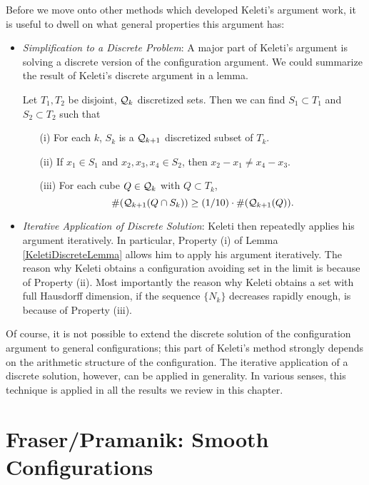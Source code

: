 Before we move onto other methods which developed Keleti's argument work, it is useful to dwell on what general properties this argument has:
%
\begin{itemize}
    \item \emph{Simplification to a Discrete Problem}: A major part of Keleti's argument is solving a discrete version of the configuration argument. We could summarize the result of Keleti's discrete argument in a lemma.
    \begin{lemma} \label{KeletiDiscreteLemma}
        Let $T_1, T_2$ be disjoint, $\operatorname{\mathcal{Q}}_k$ discretized sets. Then we can find $S_1 \subset T_1$ and $S_2 \subset T_2$ such that
        \begin{enumerate}
            \item[(i)] For each $k$, $S_k$ is a $\operatorname{\mathcal{Q}}_{k+1}$ discretized subset of $T_k$.
            \item[(ii)] If $x_1 \in S_1$ and $x_2,x_3,x_4 \in S_2$, then $x_2 - x_1 \neq x_4 - x_3$.
            \item[(iii)] For each cube $Q \in \operatorname{\mathcal{Q}}_k$ with $Q \subset T_k$,
            \[ \#(\operatorname{\mathcal{Q}}_{k+1}(Q \cap S_k)) \geq (1/10) \cdot \#(\operatorname{\mathcal{Q}}_{k+1}(Q)). \]
        \end{enumerate}
    \end{lemma}

    \item \emph{Iterative Application of Discrete Solution}: Keleti then repeatedly applies his argument iteratively. In particular, Property (i) of Lemma \ref{KeletiDiscreteLemma} allows him to apply his argument iteratively. The reason why Keleti obtains a configuration avoiding set in the limit is because of Property (ii). Most importantly the reason why Keleti obtains a set with full Hausdorff dimension, if the sequence $\{ N_k \}$ decreases rapidly enough, is because of Property (iii).
\end{itemize}

Of course, it is not possible to extend the discrete solution of the configuration argument to general configurations; this part of Keleti's method strongly depends on the arithmetic structure of the configuration. The iterative application of a discrete solution, however, can be applied in generality. In various senses, this technique is applied in all the results we review in this chapter.







\section{Fraser/Pramanik: Smooth Configurations}

